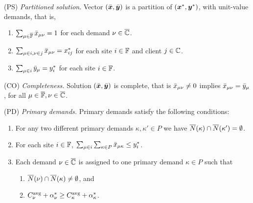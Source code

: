 \documentclass[oneside,final]{ucr}
\begin{document}
\begin{description}
	
      \renewcommand{\theenumii}{(\alph{enumii})}
      \renewcommand{\labelenumii}{\theenumii}

\item{(PS)} \emph{Partitioned solution}.
Vector $(\bar{\boldsymbol{x}},\bar{\boldsymbol{y}})$ is a partition of $(\boldsymbol{x}^\ast,\boldsymbol{y}^\ast)$, with unit-value
  demands, that is,

	\begin{enumerate}
	\item \label{PS:one} 
          $\sum_{\mu\in\overline{\mathbb{F}}} {\bar x}_{\mu\nu} = 1$ for each demand $\nu\in\overline{\mathbb{C}}$. 
	\item \label{PS:xij} $\sum_{\mu\in i, \nu\in j} {\bar x}_{\mu\nu}
          = x^\ast_{ij}$ for each site $i\in\mathbb{F}$ and client $j\in\mathbb{C}$.
	\item \label{PS:yi}
          $\sum_{\mu\in i} {\bar y}_{\mu} = y^\ast_i$ for each site $i\in\mathbb{F}$.
	\end{enumerate}
		
\item{(CO)} \emph{Completeness.}
	Solution   $(\bar{\boldsymbol{x}},\bar{\boldsymbol{y}})$ is complete, that is ${\bar x}_{\mu\nu}\neq 0$ implies
				${\bar x}_{\mu\nu} = {\bar y}_{\mu}$, for all $\mu\in\overline{\mathbb{F}}, \nu\in\overline{\mathbb{C}}$.

\item{(PD)} \emph{Primary demands.}
	Primary demands satisfy the following conditions:

	\begin{enumerate}
		
	\item\label{PD:disjoint}  For any two different primary demands $\kappa,\kappa'\in P$ we have
				${\overline{N}}(\kappa)\cap {\overline{N}}(\kappa') = \emptyset$.

	\item \label{PD:yi} For each site $i\in\mathbb{F}$, 
		$ \sum_{\mu\in i}\sum_{\kappa\in P}{\bar x}_{\mu\kappa} \leq y_i^\ast$.
		
	\item \label{PD:assign} Each demand $\nu\in\overline{\mathbb{C}}$ is assigned
        to one primary demand $\kappa\in P$ such that

  			\begin{enumerate}
	
				\item \label{PD:assign:overlap} ${\overline{N}}(\nu) \cap {\overline{N}}(\kappa) \neq \emptyset$, and
				\item \label{PD:assign:cost} $C^{{\mbox{\scriptsize\rm avg}}}_{\nu}+\alpha_{\nu}^\ast \geq
        			C^{{\mbox{\scriptsize\rm avg}}}_{\kappa}+\alpha_{\kappa}^\ast$.


\end{enumerate}
\end{enumerate}
\end{description}
\end{document}
